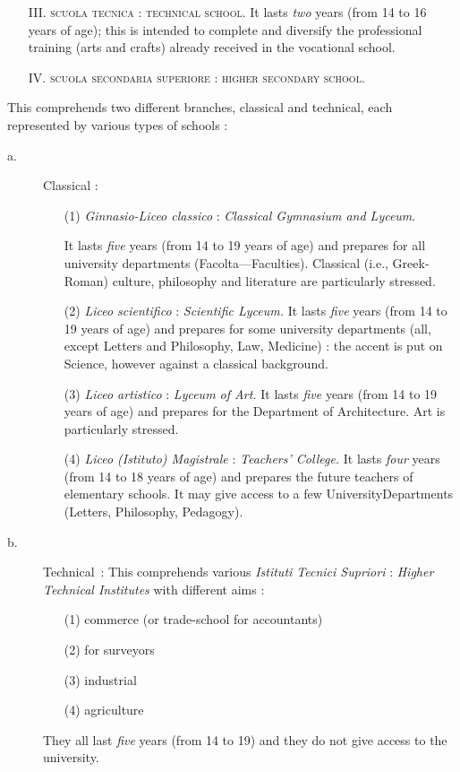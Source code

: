 \begin{itemize}
\item[III.] \textsc{scuola tecnica} : \textsc{technical school.} It lasts {\em two} years (from 14 to 16 years of age); this is intended to complete and diversify the professional training (arts and crafts) already received in the vocational school.

\item[IV.] \textsc{scuola secondaria superiore} : \textsc{higher secondary school.}
\end{itemize}

This comprehends two different branches, classical and technical, each represented by various types of schools :
\begin{description}
\item[\rm a.] Classical : 
\begin{itemize}
\item[(1)] {\em Ginnasio-Liceo classico} : {\em Classical Gymnasium and Lyceum}.

It lasts {\em five} years (from 14 to 19 years of age) and prepares for all university departments (Facolta---Faculties). Classical (i.e., Greek-Roman) culture, philosophy and literature are particularly stressed.

\item[(2)] {\em Liceo scientifico} : {\em Scientific Lyceum.} It lasts {\em five} years (from 14 to 19 years of age) and prepares for some university departments (all, except Letters and Philosophy, Law, Medicine) : the accent is put on Science, however against a classical background.

\item[(3)] {\em Liceo artistico} : {\em Lyceum of Art.} It lasts {\em five} years (from 14 to 19 years of age) and prepares for the Department of Architecture. Art is particularly stressed.

\item[(4)] {\em Liceo (Istituto) Magistrale} : {\em Teachers' College.} It lasts {\em four} years (from 14 to 18 years of age) and prepares the future teachers of elementary schools. It may give access to a few University\pageoriginale Departments (Letters, Philosophy, Pedagogy).
\end{itemize}

\item[\rm b.] Technical~: This comprehends various {\em Istituti Tecnici Supriori} : {\em Higher Technical Institutes} with different aims :
\begin{itemize}
\item[(1)] commerce (or trade-school for accountants)

\item[(2)] for surveyors

\item[(3)] industrial

\item[(4)] agriculture
\end{itemize}
They all last {\em five} years (from 14 to 19) and they do not give access to the university.
\end{description}

